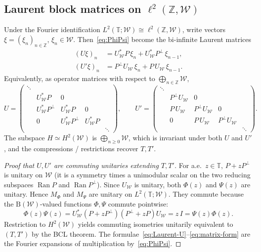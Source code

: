 \documentclass[11pt]{article}
\begin{document}
\subsection*{Laurent block matrices on \(\ell^2(\mathbb{Z},\mathcal{W})\)}

Under the Fourier identification \(L^2(\mathbb{T};\mathcal{W})\cong\ell^2(\mathbb{Z},\mathcal{W})\),
write vectors \(\xi=(\xi_n)_{n\in\mathbb{Z}}\), \(\xi_n\in\mathcal{W}\). Then~\eqref{eq:PhiPsi}
become the bi-infinite Laurent matrices
\begin{equation}
\label{eq:Laurent-U}
\boxed{
\begin{aligned}
(U\xi)_n
&=
U_{\mathcal{W}}^*P\,\xi_n
+
U_{\mathcal{W}}^*P^\perp\,\xi_{n-1},
\\[1mm]
(U'\xi)_n
&=
P^\perp U_{\mathcal{W}}\,\xi_n
+
P\,U_{\mathcal{W}}\,\xi_{n-1}.
\end{aligned}
}
\end{equation}
Equivalently, as operator matrices with respect to \(\bigoplus_{n\in\mathbb{Z}}\mathcal{W}\),
\begin{equation}
\label{eq:matrix-form}
U
=
\begin{pmatrix}
\ddots & & & & \\
& U_{\mathcal{W}}^*P & 0 & & \\
& U_{\mathcal{W}}^*P^\perp & U_{\mathcal{W}}^*P & 0 & \\
& 0 & U_{\mathcal{W}}^*P^\perp & U_{\mathcal{W}}^*P & \\
& & & & \ddots
\end{pmatrix},
\qquad
U'
=
\begin{pmatrix}
\ddots & & & & \\
& P^\perp U_{\mathcal{W}} & 0 & & \\
& P\,U_{\mathcal{W}} & P^\perp U_{\mathcal{W}} & 0 & \\
& 0 & P\,U_{\mathcal{W}} & P^\perp U_{\mathcal{W}} & \\
& & & & \ddots
\end{pmatrix}.
\end{equation}
The subspace \(H\simeq H^2(\mathcal{W})\) is \(\bigoplus_{n\ge 0}\mathcal{W}\), which is invariant under
both \(U\) and \(U'\), and the compressions / restrictions recover \(T,T'\).

\begin{proof}[Proof that \(U,U'\) are commuting unitaries extending \(T,T'\)]
For a.e.\ \(z\in\mathbb{T}\), \(P+zP^\perp\) is unitary on \(\mathcal{W}\) (it is a
symmetry times a unimodular scalar on the two reducing subspaces \(\operatorname{Ran}P\) and
\(\operatorname{Ran}P^\perp\)). Since \(U_{\mathcal{W}}\) is unitary, both \(\Phi(z)\) and
\(\Psi(z)\) are unitary. Hence \(M_{\Phi}\) and \(M_{\Psi}\) are unitary on
\(L^2(\mathbb{T};\mathcal{W})\). They commute because the \(\mathrm{B}(\mathcal{W})\)-valued
functions \(\Phi,\Psi\) commute pointwise:
\[
\Phi(z)\Psi(z)=U_{\mathcal{W}}^*(P+zP^\perp)(P^\perp+zP)U_{\mathcal{W}}
=z\,I
=\Psi(z)\Phi(z).
\]
Restriction to \(H^2(\mathcal{W})\) yields commuting isometries unitarily equivalent to
\((T,T')\) by the BCL theorem. The formulae~\eqref{eq:Laurent-U}--\eqref{eq:matrix-form}
are the Fourier expansions of multiplication by~\eqref{eq:PhiPsi}.
\end{proof}
\end{document}
